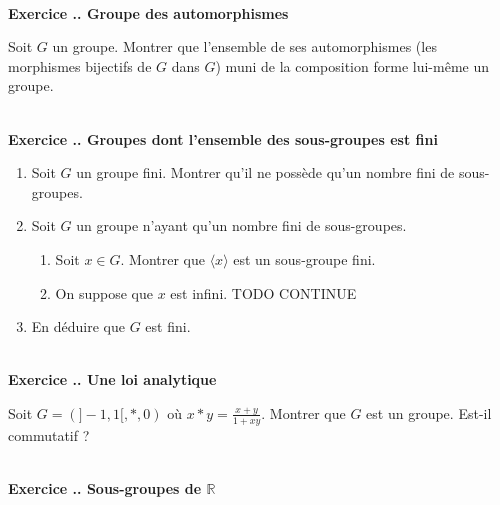 \documentclass{article}
\newcommand{\mb}[1]{\mathbb{#1}}
\newcounter{exo}
\newcommand{\exercice}[1][\null]{\textbf{\\ Exercice \thesection.\theexo. #1} \addtocounter{exo}{1}}
\begin{document}
\exercice[Groupe des automorphismes]


Soit $G$ un groupe. Montrer que l'ensemble de ses automorphismes (les morphismes bijectifs de $G$ dans $G$) muni de la composition forme lui-même un groupe.


\exercice[Groupes dont l'ensemble des sous-groupes est fini]

\begin{enumerate}

\item Soit $G$ un groupe fini. Montrer qu'il ne possède qu'un nombre fini de sous-groupes.

\item Soit $G$ un groupe n'ayant qu'un nombre fini de sous-groupes.

\begin{enumerate}

\item Soit $x \in G$. Montrer que $\langle x \rangle$ est un sous-groupe fini.

\item On suppose que $x$ est infini. TODO CONTINUE

\end{enumerate}

\item En déduire que $G$ est fini.

\end{enumerate}


\exercice[Une loi analytique]

Soit $G = (]-1,1[, *, 0)$ où $x*y = \frac{x+y}{1+xy}$. Montrer que $G$ est un groupe. Est-il commutatif ?

\exercice[Sous-groupes de $\mb{R}$]
\end{document}

